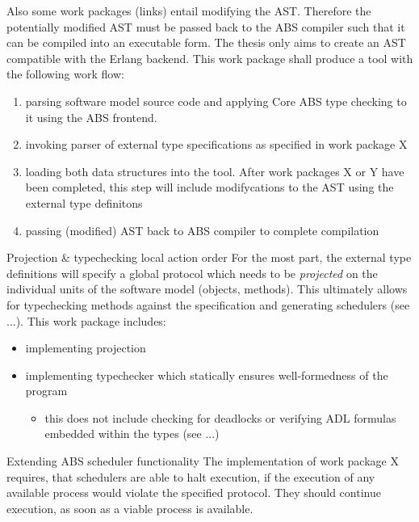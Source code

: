 \documentclass[paper=a4,nochapname,accentcolor=tud9c]{tudexercise}
\makeatletter
\def\namedlabel#1#2{\begingroup
    #1%
    \def\@currentlabel{\thedescriptcount}%
    \phantomsection\label{#2}\endgroup
}
\newcounter{descriptcount}
\renewcommand*\thedescriptcount{[\Alph{descriptcount}]}}
\renewcommand*\thedescriptcount{\roman{descriptcount}}}
\makeatother
\begin{document}
\begin{enumdescript}
    Also some work packages (links) entail modifying the AST.
    Therefore the potentially modified AST must be passed back to the ABS
    compiler such that it can be compiled into an executable
    form. The thesis only aims to create an AST compatible with the Erlang backend.
    This work package shall produce a tool with the following work flow:
    \begin{enumerate}
      \item parsing software model source code and applying Core ABS type
        checking to it using the ABS frontend.
      \item invoking parser of external type specifications as specified in work
        package X
      \item loading both data structures into the tool. After work packages
        X or Y have been completed, this step will include modifycations to
        the AST using the external type definitons
      \item passing (modified) AST back to ABS compiler to complete compilation
    \end{enumerate}
  \item[\namedlabel{Projection \& typechecking local action order}{WPProjectionAndTC}]%
    For the most part, the external type definitions will specify a global
    protocol which needs to be \emph{projected} on the individual units of the
    software model (objects, methods).
    This ultimately allows for typechecking methods against the specification
    and generating schedulers (see ...).
    This work package includes:
    \begin{itemize}
      \item implementing projection
      \item implementing typechecker which statically ensures well-formedness
        of the program
        \begin{itemize}
          \item this does not include checking for deadlocks or verifying ADL
            formulas embedded within the types (see ...)
        \end{itemize}
    \end{itemize}
  \item[\namedlabel{Extending ABS scheduler functionality}{WPExtendScheduler}]%
    The implementation of work package X requires, that schedulers are able to
    halt execution, if the execution of any available process would violate the
    specified protocol. They should continue execution, as soon as a viable
    process is available.


\end{enumdescript}
\end{document}
